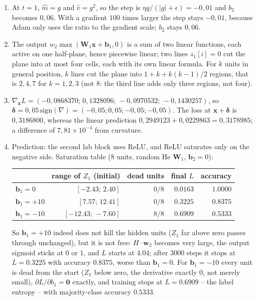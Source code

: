 \begin{enumerate}[label=\textbf{25.\arabic*}]
  \item At $t=1$, $\hat m=g$ and $\hat v=g^{2}$, so the step is
        $\eta g/(|g|+\epsilon)=-0{,}01$ and $b_{2}$ becomes $0{,}06$. With a gradient
        $100$ times larger the step stays $-0{,}01$, because Adam only
        uses the ratio to the gradient scale; $b_{2}$ stays $0{,}06$.

  \item 
The output $w_{2}\max(\mathbf{W}_{1}\mathbf{x}+\mathbf{b}_{1},0)$ is a sum
        of two linear functions, each active on one half-plane, hence piecewise
        linear; two lines $z_{1}[i]=0$ cut the plane into at most four cells, each
        with its own linear formula. For $k$ units in general position, $k$ lines
        cut the plane into $1+k+k(k-1)/2$ regions, that is $2,4,7$ for $k=1,2,3$
        (not $8$: the third line adds only three regions, not four).

  \item $\nabla_{\mathbf{x}}L=(-0{,}0868370;\,0{,}1328096;\,-0{,}0970532;\,
        -0{,}1430257)$, so $\boldsymbol{\delta}=0{,}05\,\mathrm{sign}(\nabla)
        =(-0{,}05;0{,}05;-0{,}05;-0{,}05)$. The loss at $\mathbf{x}+\boldsymbol{\delta}$
        is $0{,}3186800$, whereas the linear prediction
        $0{,}2949123+0{,}0229863=0{,}3178985$; a difference of $7{,}81\times10^{-4}$ from
        curvature.

  \item 
Prediction: the second lab block uses ReLU, and ReLU saturates only on the
        negative side. Saturation table ($8$ units, random He $\mathbf{W}_{1}$,
        $\mathbf{b}_{2}=0$):
        \begin{center}
        \begin{tabular}{lrrrr}
        & range of $Z_{1}$ (initial) & dead units & final $L$ & accuracy \\ \hline
        $\mathbf{b}_{1}=0$   & $[-2.43;\,2.40]$   & $0/8$ & $0.0163$ & $1.0000$ \\
        $\mathbf{b}_{1}=+10$ & $[7.57;\,12.41]$   & $0/8$ & $0.3225$ & $0.8375$ \\
        $\mathbf{b}_{1}=-10$ & $[-12.43;\,-7.60]$ & $8/8$ & $0.6909$ & $0.5333$
        \end{tabular}
        \end{center}
        So $\mathbf{b}_{1}=+10$ indeed does not kill the hidden units ($Z_{1}$ far
        above zero passes through unchanged), but it is not free: $H\cdot\mathbf{w}_{2}$
        becomes very large, the output sigmoid sticks at $0$ or $1$, and $L$ starts
        at $4.04$; after $3000$ steps it stops at $L=0.3225$ with accuracy $0.8375$,
        worse than $\mathbf{b}_{1}=0$. For $\mathbf{b}_{1}=-10$ every unit is dead
        from the start ($Z_{1}$ below zero, the derivative exactly $0$, not merely
        small), $\partial L/\partial b_{1}=\mathbf{0}$ exactly, and training stops at
        $L=0.6909$ -- the label entropy -- with majority-class accuracy $0.5333$.
  \end{enumerate}

